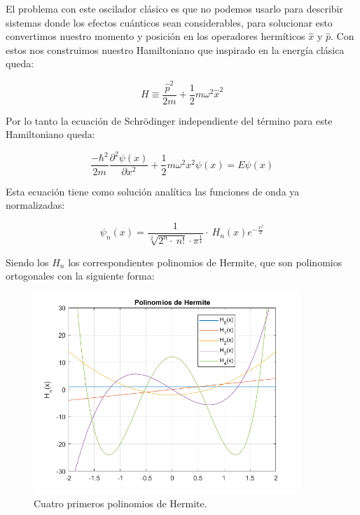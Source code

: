 \documentclass[12pt]{article}
\begin{document}
    El problema con este oscilador clásico es que no podemos usarlo para describir sistemas donde los efectos cuánticos sean considerables,
    para solucionar esto convertimos nuestro momento y posición en los operadores hermíticos $\hat{x}$ y $\hat{p}$. Con estos nos construimos nuestro Hamiltoniano que inspirado en la energía clásica queda:
    
    \begin{equation}
    H\equiv \frac{\hat{p}^2}{2m} + \frac{1}{2}m\omega^2\hat{x}^2
    \end{equation}
    
    Por lo tanto la ecuación de Schrödinger independiente del término para este Hamiltoniano queda:
    
    \begin{equation}
        \frac{-\hbar^2}{2m}\frac{\partial^2\psi(x)}{\partial x^2} + \frac{1}{2}m\omega^2x^2\psi(x)=E\psi(x)
    \end{equation}
    
    Esta ecuación tiene como solución analítica las funciones de onda ya normalizadas:
    
    \begin{equation}
        \boxed{\psi _n\left(x\right)=\frac{1}{\sqrt[2]{2^n\cdot \:n!}\cdot \pi ^{\frac{1}{4}}}\cdot \:H_n\left(x\right)e^{-\frac{x^2}{2}}}
    \end{equation}
    
    Siendo los $H_n$ los correspondientes polinomios de Hermite, que son polinomios ortogonales con la siguiente forma:
    
    \begin{figure}[H]
        \centering
        \includegraphics[width=0.9\textwidth]{fotos/PolinomiosHermite.png}
        \caption{Cuatro primeros polinomios de Hermite.}
        \label{PolinomiosHermite}
    \end{figure}
    
\end{document}
